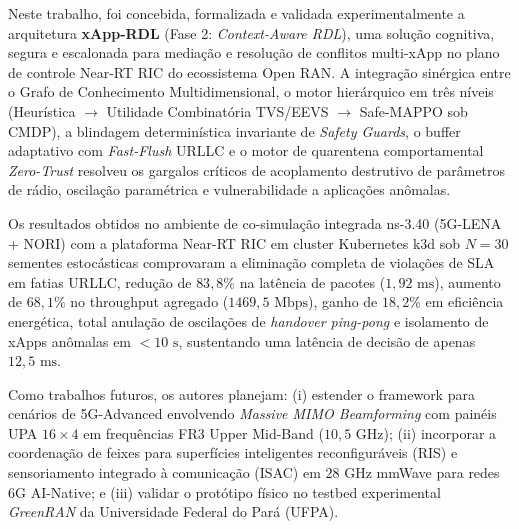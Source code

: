 \documentclass[12pt]{article}
\begin{document}
Neste trabalho, foi concebida, formalizada e validada experimentalmente a arquitetura \textbf{xApp-RDL} (Fase 2: \textit{Context-Aware RDL}), uma solução cognitiva, segura e escalonada para mediação e resolução de conflitos multi-xApp no plano de controle Near-RT RIC do ecossistema Open RAN. A integração sinérgica entre o Grafo de Conhecimento Multidimensional, o motor hierárquico em três níveis (Heurística $\to$ Utilidade Combinatória TVS/EEVS $\to$ Safe-MAPPO sob CMDP), a blindagem determinística invariante de \textit{Safety Guards}, o buffer adaptativo com \textit{Fast-Flush} URLLC e o motor de quarentena comportamental \textit{Zero-Trust} resolveu os gargalos críticos de acoplamento destrutivo de parâmetros de rádio, oscilação paramétrica e vulnerabilidade a aplicações anômalas.

Os resultados obtidos no ambiente de co-simulação integrada ns-3.40 (5G-LENA + NORI) com a plataforma Near-RT RIC em cluster Kubernetes k3d sob $N=30$ sementes estocásticas comprovaram a eliminação completa de violações de SLA em fatias URLLC, redução de $83,8\%$ na latência de pacotes ($1,92\text{ ms}$), aumento de $68,1\%$ no throughput agregado ($1469,5\text{ Mbps}$), ganho de $18,2\%$ em eficiência energética, total anulação de oscilações de \textit{handover ping-pong} e isolamento de xApps anômalas em $<10\text{ s}$, sustentando uma latência de decisão de apenas $12,5\text{ ms}$.

Como trabalhos futuros, os autores planejam: (i) estender o framework para cenários de 5G-Advanced envolvendo \textit{Massive MIMO Beamforming} com painéis UPA $16\times 4$ em frequências FR3 Upper Mid-Band ($10,5\text{ GHz}$); (ii) incorporar a coordenação de feixes para superfícies inteligentes reconfiguráveis (RIS) e sensoriamento integrado à comunicação (ISAC) em $28\text{ GHz}$ mmWave para redes 6G AI-Native; e (iii) validar o protótipo físico no testbed experimental \textit{GreenRAN} da Universidade Federal do Pará (UFPA).



\end{document}
